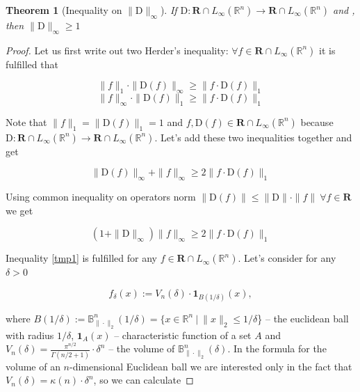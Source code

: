 \documentclass{article}
\newtheorem{theorem}{Theorem}
\begin{document}
    \begin{theorem}[Inequality on $\|\text{D}\|_{\infty}$] \label{Th3}
        If $\text{D} : \mathbf{R} \cap L_{\infty}(\mathbb{R}^n) \to \mathbf{R} \cap L_{\infty}(\mathbb{R}^n)$ and , then $\|\text{D}\|_{\infty} \geq 1$
    \end{theorem}

    \begin{proof}
        Let us first write out two Herder's inequality: $\forall f \in \mathbf{R} \cap L_{\infty}(\mathbb{R}^n)$ it is fulfilled that

        \begin{equation*}
            \|f\|_1 \cdot \|\text{D}(f)\|_{\infty} \geq \|f \cdot \text{D}(f)\|_1
        \end{equation*}
        \begin{equation*}
            \|f\|_{\infty} \cdot \|\text{D}(f)\|_1 \geq \|f \cdot \text{D}(f)\|_1
        \end{equation*}

        Note that $\|f\|_1 = \|\text{D}(f)\|_1 = 1$ and $f, \text{D}(f) \in \mathbf{R} \cap L_{\infty}(\mathbb{R}^n)$ because $\text{D} : \mathbf{R} \cap L_{\infty}(\mathbb{R}^n) \to \mathbf{R} \cap L_{\infty}(\mathbb{R}^n)$. Let's add these two inequalities together and get

        \begin{equation*}
            \|\text{D}(f)\|_{\infty} + \|f\|_{\infty} \geq 2 \|f \cdot \text{D}(f)\|_1
        \end{equation*}

        Using common inequality on operators norm $\|\text{D}(f)\| \leq \|\text{D}\| \cdot \|f\| ~\forall f \in \mathbf{R}$ we get

        \begin{equation} \label{tmp1}
            (1 + \|\text{D}\|_{\infty}) \|f\|_{\infty} \geq 2 \|f \cdot \text{D}(f)\|_1
        \end{equation}

        Inequality \eqref{tmp1} is fulfilled for any $f \in \mathbf{R} \cap L_{\infty}(\mathbb{R}^n)$. Let's consider for any $\delta > 0$

        \begin{equation*}
            f_{\delta}(x) := V_n(\delta) \cdot \textbf{1}_{B(1/\delta)}(x),
        \end{equation*}

        where $B(1/\delta) := \mathbb{B}^n_{\|\cdot\|_2}(1/\delta) = \{x \in \mathbb{R}^n ~|~ \|x\|_2 \leq 1/\delta$\} -- the euclidean ball with radius $1/\delta$, $\textbf{1}_{A}(x)$ -- characteristic function of a set $A$ and $V_n(\delta) = \frac{\pi^{n/2}}{\Gamma(n/2+1)} \cdot \delta^n$ -- the volume of $\mathbb{B}^n_{\|\cdot\|_2}(\delta)$. In the formula for the volume of an $n$-dimensional Euclidean ball we are interested only in the fact that $V_n(\delta) = \kappa(n) \cdot \delta^n$, so we can calculate


\end{proof}
\end{document}
